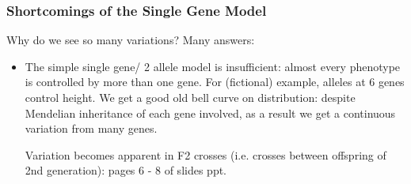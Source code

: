\documentclass{scrartcl}
\begin{document}
\subsubsection{Shortcomings of the Single Gene Model}
\label{sec:4-2}
Why do we see so many variations? Many answers:
\begin{itemize}
\item The simple single gene/ 2 allele model is insufficient: almost every phenotype is controlled by more than one gene.
For (fictional) example, alleles at 6 genes control height.
We get a good old bell curve on distribution: despite Mendelian inheritance of each gene involved, as a result we get a continuous variation from many genes.

Variation becomes apparent in F2 crosses (i.e. crosses between offspring of 2nd generation): pages 6 - 8 of slides ppt.


\end{itemize}
\end{document}
